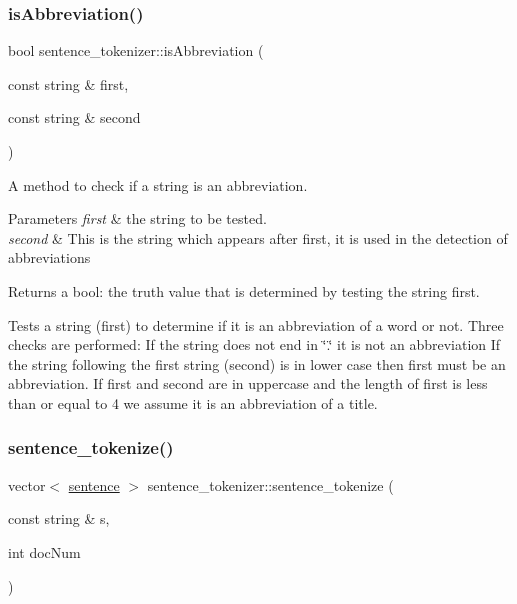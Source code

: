 \subsubsection{\texorpdfstring{is\+Abbreviation()}{isAbbreviation()}}
{\footnotesize\ttfamily bool sentence\+\_\+tokenizer\+::is\+Abbreviation (\begin{DoxyParamCaption}\item[{const string \&}]{first,  }\item[{const string \&}]{second }\end{DoxyParamCaption})}



A method to check if a string is an abbreviation. 


\begin{DoxyParams}{Parameters}
{\em first} & the string to be tested. \\
\hline
{\em second} & This is the string which appears after first, it is used in the detection of abbreviations \\
\hline
\end{DoxyParams}
\begin{DoxyReturn}{Returns}
a bool\+: the truth value that is determined by testing the string first.
\end{DoxyReturn}
Tests a string (first) to determine if it is an abbreviation of a word or not. Three checks are performed\+: If the string does not end in \char`\"{}.\char`\"{} it is not an abbreviation If the string following the first string (second) is in lower case then first must be an abbreviation. If first and second are in uppercase and the length of first is less than or equal to 4 we assume it is an abbreviation of a title. \mbox{\label{classsentence__tokenizer_ab394b821c6d32d41ae07ae84a0d1b5a6}} 
\subsubsection{\texorpdfstring{sentence\+\_\+tokenize()}{sentence\_tokenize()}}
{\footnotesize\ttfamily vector$<$ \hyperlink{classsentence}{sentence} $>$ sentence\+\_\+tokenizer\+::sentence\+\_\+tokenize (\begin{DoxyParamCaption}\item[{const string \&}]{s,  }\item[{int}]{doc\+Num }\end{DoxyParamCaption})}



